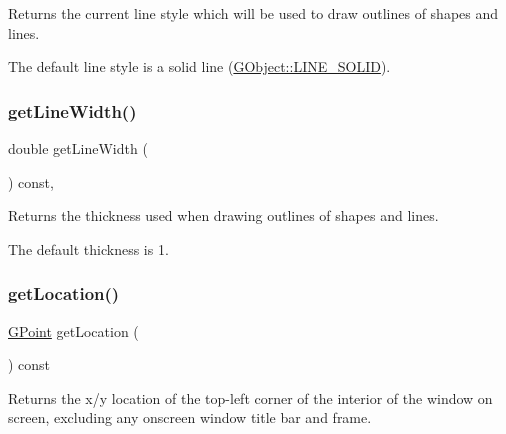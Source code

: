 Returns the current line style which will be used to draw outlines of shapes and lines. 

The default line style is a solid line (\mbox{\hyperlink{classsgl_1_1GObject_a86e0f5648542856159bb40775c854aa7a700c78bc2cd76acaab26651bf7b4941f}{G\+Object\+::\+L\+I\+N\+E\+\_\+\+S\+O\+L\+ID}}). \mbox{\label{classsgl_1_1GDrawingSurface_a85ff266dc3eb63d9f2d8e5a4487fd3c0}} 
\subsubsection{\texorpdfstring{get\+Line\+Width()}{getLineWidth()}}
{\footnotesize\ttfamily double get\+Line\+Width (\begin{DoxyParamCaption}{ }\end{DoxyParamCaption}) const\hspace{0.3cm}{\ttfamily [virtual]}, {\ttfamily [inherited]}}



Returns the thickness used when drawing outlines of shapes and lines. 

The default thickness is 1. \mbox{\label{classsgl_1_1GWindow_a4f83802015511edeb63b892830812c11}} 
\subsubsection{\texorpdfstring{get\+Location()}{getLocation()}}
{\footnotesize\ttfamily \mbox{\hyperlink{structsgl_1_1GPoint}{G\+Point}} get\+Location (\begin{DoxyParamCaption}{ }\end{DoxyParamCaption}) const\hspace{0.3cm}{\ttfamily [virtual]}}



Returns the x/y location of the top-\/left corner of the interior of the window on screen, excluding any onscreen window title bar and frame. 

\mbox{\label{classsgl_1_1GForwardDrawingSurface_a342aaa6de62a4a324a2e4f3921db1d3e}} 
